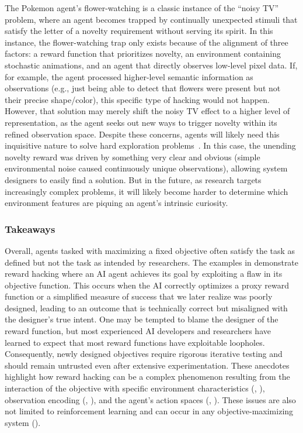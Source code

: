 \documentclass[10pt]{article}
\def\citep#1{}%
\begin{document}


The Pokemon agent's flower-watching is a classic instance of the ``noisy TV''~\citep{fortunato2017noisy} problem, where an agent becomes trapped by continually unexpected stimuli that satisfy the letter of a novelty requirement without serving its spirit.
In this instance, the flower-watching trap only exists because of the alignment of three factors: a reward function that prioritizes novelty, an environment containing stochastic animations, and an agent that directly observes low-level pixel data.
If, for example, the agent processed higher-level semantic information as observations (e.g., just being able to detect that flowers were present but not their precise shape/color), this specific type of hacking would not happen. However, that solution may merely shift the noisy TV effect to a higher level of representation, as the agent seeks out new ways to trigger novelty within its refined observation space. Despite these concerns, agents will likely need this inquisitive nature to solve hard exploration problems~\citep{Ecoffet2021firstreturngoexplore}.
In this case, the unending novelty reward was driven by something very clear and obvious (simple environmental noise caused continuously unique observations), allowing system designers to easily find a solution. 
But in the future, as research targets increasingly complex problems, it will likely become harder to determine which environment features are piquing an agent's intrinsic curiosity.

\subsubsection{Takeaways}

Overall, agents tasked with maximizing a fixed objective often satisfy the task as defined but not the task as intended by researchers.
The examples in  demonstrate reward hacking
where an AI agent achieves its goal by exploiting a flaw in its objective function.
This occurs when the AI correctly optimizes a proxy reward function or a simplified measure of success that we later realize was poorly designed, leading to an outcome that is technically correct but misaligned with the designer's true intent. 
One may be tempted to blame the designer of the reward function, but most experienced AI developers and researchers have learned to expect that most reward functions have exploitable loopholes. 
Consequently, newly designed objectives require rigorous iterative testing and should remain untrusted even after extensive experimentation.
These anecdotes highlight how reward hacking can be a complex phenomenon resulting from the interaction of the objective with specific environment characteristics (, ), observation encoding (, ), and the agent's action spaces (, ).
These issues are also not limited to reinforcement learning and can occur in any objective-maximizing system (). 
\end{document}
